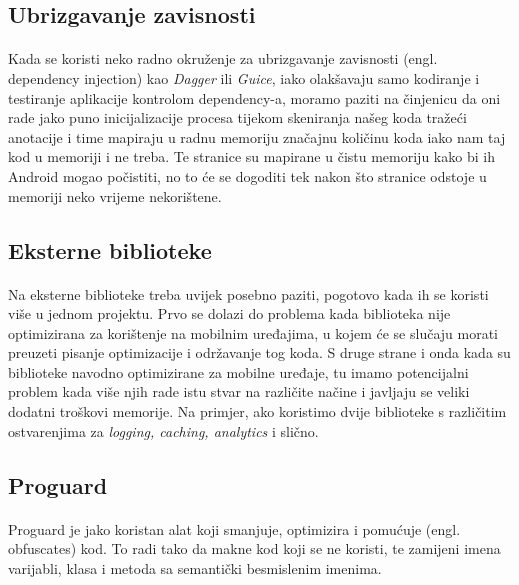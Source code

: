 \documentclass[times, utf8, zavrsni]{fer}
\begin{document}
\subsection{Ubrizgavanje zavisnosti}
\paragraph{}
Kada se koristi neko radno okruženje za ubrizgavanje zavisnosti (engl. dependency injection) kao \textit{Dagger} ili \textit{Guice}, iako olakšavaju samo kodiranje i testiranje aplikacije kontrolom dependency-a, moramo paziti na činjenicu da oni rade jako puno inicijalizacije procesa tijekom skeniranja našeg koda tražeći anotacije i time mapiraju u radnu memoriju značajnu količinu koda iako nam taj kod u memoriji i ne treba. Te stranice su mapirane u čistu memoriju kako bi ih Android mogao počistiti, no to će se dogoditi tek nakon što stranice odstoje u memoriji neko vrijeme nekorištene.

\subsection{Eksterne biblioteke}
\paragraph{}
Na eksterne biblioteke treba uvijek posebno paziti, pogotovo kada ih se koristi više u jednom projektu. Prvo se dolazi do problema kada biblioteka nije optimizirana za korištenje na mobilnim uređajima, u kojem će se slučaju morati preuzeti pisanje optimizacije i održavanje tog koda. S druge strane i onda kada su biblioteke navodno optimizirane za mobilne uređaje, tu imamo potencijalni problem kada više njih rade istu stvar na različite načine i javljaju se veliki dodatni troškovi memorije. Na primjer, ako koristimo dvije biblioteke s različitim ostvarenjima za \textit{logging, caching, analytics} i slično.

\subsection{Proguard}
\paragraph{}
Proguard je jako koristan alat koji smanjuje, optimizira i pomućuje (engl. obfuscates) kod. To radi tako da makne kod koji se ne koristi, te zamijeni imena varijabli, klasa i metoda sa semantički besmislenim imenima. 
\end{document}
